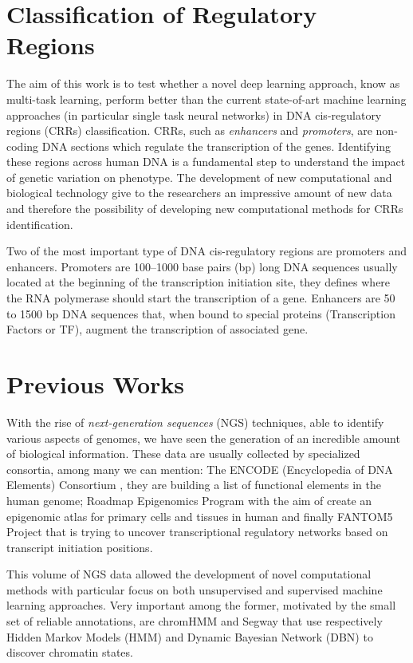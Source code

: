 \section{Classification of Regulatory Regions}
The aim of this work is to test whether a novel deep learning approach,
know as multi-task learning, perform better than the current state-of-art
machine learning approaches (in particular single task neural networks) in
DNA cis-regulatory regions (CRRs) classification. CRRs, such as
\emph{enhancers} and \emph{promoters}, are non-coding DNA sections which
regulate the transcription of the genes. Identifying these regions across
human DNA is a fundamental step to understand the impact of genetic
variation on phenotype. The development of new computational and
biological technology give to the researchers an impressive amount of new
data and therefore the possibility of developing new computational methods
for CRRs identification.

Two of the most important type of DNA cis-regulatory regions are promoters
and enhancers. Promoters are 100–1000 base pairs (bp) long DNA sequences
usually located at the beginning of the transcription initiation site,
they defines where the RNA polymerase should start the transcription of a
gene. Enhancers are 50 to 1500 bp DNA sequences that, when bound to
special proteins (Transcription Factors or TF), augment the transcription
of associated gene.

\section{Previous Works}
With the rise of \emph{next-generation sequences} (NGS) techniques, able
to identify various aspects of genomes, we have seen the generation of an
incredible amount of biological information. These data are usually
collected by specialized consortia, among many we can mention: The ENCODE
(Encyclopedia of DNA Elements) Consortium \cite{ENCODE_data}, they are
building a list of functional elements in the human genome; Roadmap
Epigenomics Program \cite{ROADMAP} with the aim of create an epigenomic
atlas for primary cells and tissues in human and finally FANTOM5 Project
\cite{FANTOM_data} that is trying to uncover transcriptional regulatory
networks based on transcript initiation positions.

This volume of NGS data allowed the development of novel computational
methods with particular focus on both unsupervised and supervised machine
learning approaches. Very important among the former, motivated by the
small set of reliable annotations, are chromHMM \cite{ernst2012chromhmm}
and Segway \cite{HoffmanSegway} that use respectively Hidden Markov Models
(HMM) and Dynamic Bayesian Network (DBN) to discover chromatin states.
 
